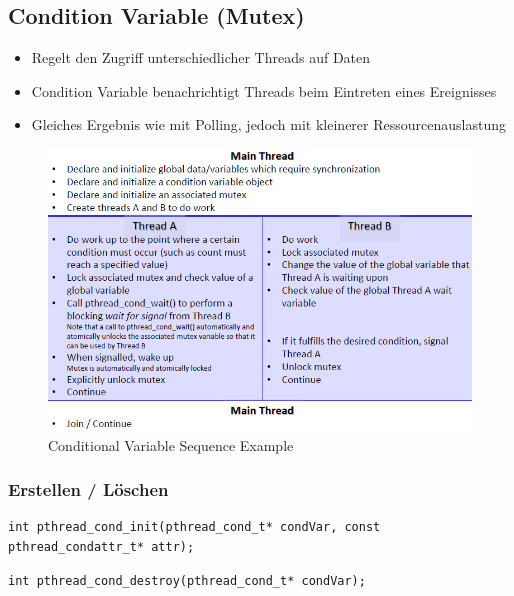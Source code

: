 \subsection{Condition Variable (Mutex)}
\begin{itemize}
    \item Regelt den Zugriff unterschiedlicher Threads auf Daten
    \item Condition Variable benachrichtigt Threads beim Eintreten eines Ereignisses
    \item Gleiches Ergebnis wie mit Polling, jedoch mit kleinerer Ressourcenauslastung
\end{itemize}
\begin{figure}[h!]
    \centering
    \includegraphics[width=0.5\linewidth]{images/Posix/Posix_CondVar_Sequence}
    \caption{Conditional Variable Sequence Example}
    \label{fig:posix:CondVarSequence}
\end{figure}

\subsubsection{Erstellen / Löschen}
\begin{lstlisting}[style=cpp]
int pthread_cond_init(pthread_cond_t* condVar, const pthread_condattr_t* attr);
\end{lstlisting}
\begin{lstlisting}[style=cpp]
int pthread_cond_destroy(pthread_cond_t* condVar);
\end{lstlisting}

